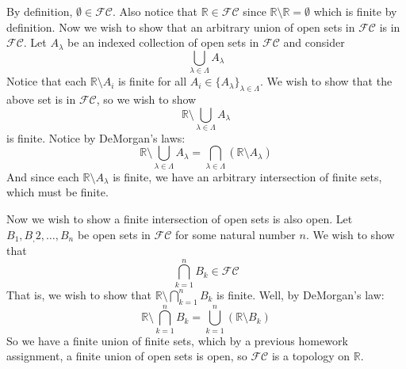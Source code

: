\documentclass[12pt]{article}
\begin{document}
By definition, $\emptyset \in \mathcal{FC}$. Also notice that $\mathbb{R} \in \mathcal{FC}$ since $\mathbb{R} \setminus \mathbb{R} = \emptyset$ which is finite by definition. 
Now we wish to show that an arbitrary union of open sets in $\mathcal{FC}$ is in $\mathcal{FC}$.
Let $A_{\lambda}$ be an indexed collection of open sets in $\mathcal{FC}$ and consider
\[\bigcup_{\lambda \in \Lambda} A_{\lambda}\]
Notice that each $\mathbb{R} \setminus A_i$ is finite for all $A_i \in \{A_{\lambda}\}_{\lambda \in \Lambda}$. We wish to show that the above set is in $\mathcal{FC}$, so we wish to show 
\[\mathbb{R} \setminus \bigcup_{\lambda \in \Lambda} A_{\lambda}\]
is finite. Notice by DeMorgan's laws:
\[\mathbb{R} \setminus \bigcup_{\lambda \in \Lambda} A_{\lambda} = \bigcap_{\lambda \in \Lambda} (\mathbb{R} \setminus A_{\lambda})\]
And since each $\mathbb{R} \setminus A_{\lambda}$ is finite, we have an arbitrary intersection of finite sets, which must be finite. 

Now we wish to show a finite intersection of open sets is also open. Let $B_1, B_,2, \ldots, B_n$ be open sets in $\mathcal{FC}$ for some natural number $n$.
We wish to show that 
\[\bigcap_{k=1}^n B_k \in \mathcal{FC}\]
That is, we wish to show that $\mathbb{R} \setminus \bigcap_{k=1}^n B_k$ is finite. Well, by DeMorgan's law:
\[\mathbb{R} \setminus \bigcap_{k=1}^n B_k = \bigcup_{k=1}^n (\mathbb{R} \setminus B_k)\]
So we have a finite union of finite sets, which by a previous homework assignment, a finite union of open sets is open, so $\mathcal{FC}$ is a topology on $\mathbb{R}$.
\end{document}
